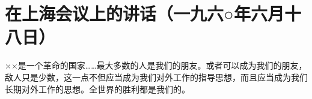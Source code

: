 \section[在上海会议上的讲话（一九六○年六月十八日）]{在上海会议上的讲话（一九六○年六月十八日）}


××是一个革命的国家……最大多数的人是我们的朋友。或者可以成为我们的朋友，敌人只是少数，这一点不但应当成为我们对外工作的指导思想，而且应当成为我们长期对外工作的思想。全世界的胜利都是我们的。


